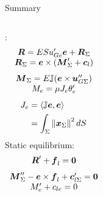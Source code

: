 \begin{frame}{Summary}{}

\begin{columns}[t]
:
\begin{displaymath}
\begin{array}{c}
{\boldsymbol{R}}=ESu_{Ge}'{\boldsymbol{e}}+{\boldsymbol{R}}_\Sigma \\
{\boldsymbol{R}}_\Sigma={\boldsymbol{e}}\times({\boldsymbol{M}}_\Sigma'+{\boldsymbol{c}}_l)
\end{array}
\end{displaymath}
\begin{displaymath}
\begin{array}{c}
{\boldsymbol{M}}_\Sigma=E{\mathbb{J}}({\boldsymbol{e}}\times{\boldsymbol{u}}_{G\Sigma}'') \\
M_e=\mu J_e\theta'_e
\end{array}
\end{displaymath}
\begin{displaymath}
\begin{split}
J_e &=\left\langle{{\mathbb{J}}{\boldsymbol{e}},{\boldsymbol{e}}}\right\rangle \\
&=\int_\Sigma\left\|{\boldsymbol{x}}_\Sigma\right\|^2d S
\end{split}
\end{displaymath}
\centering Static equilibrium:
\begin{displaymath}
\begin{array}{c}
{\boldsymbol{R}}'+{\boldsymbol{f}}_l={\bf 0}
\end{array}
\end{displaymath}
\vskip-7pt
\begin{displaymath}
\begin{array}{c}
{\boldsymbol{M}}_\Sigma''-{\boldsymbol{e}}\times{\boldsymbol{f}}_l+{\boldsymbol{c}}_{l\Sigma}'={\bf 0} \\
M_e'+c_{le}=0
\end{array}
\end{displaymath}
\end{columns}

\end{frame}

